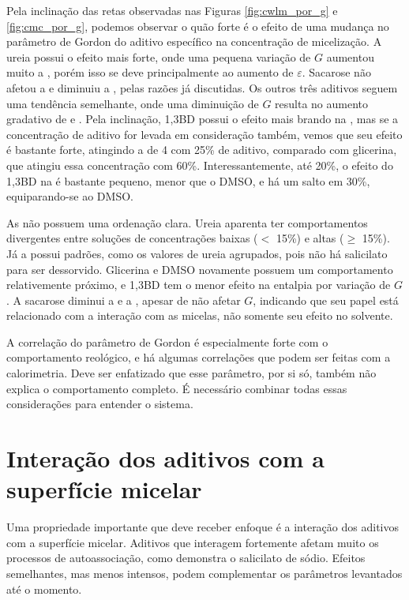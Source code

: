 		Pela inclinação das retas observadas nas Figuras \ref{fig:cwlm_por_g} e \ref{fig:cmc_por_g}, podemos observar o quão forte é o efeito de uma mudança no parâmetro de Gordon do aditivo específico na concentração de micelização. A ureia possui o efeito mais forte, onde uma pequena variação de \(G\) aumentou muito a \cmc, porém isso se deve principalmente ao aumento de \(\varepsilon\). Sacarose não afetou a \cwlm{} e diminuiu a \cmc, pelas razões já discutidas. Os outros três aditivos seguem uma tendência semelhante, onde uma diminuição de \(G\) resulta no aumento gradativo de \cwlm{} e \cmc. Pela inclinação, 1,3BD possui o efeito mais brando na \cwlm, mas se a concentração de aditivo for levada em consideração também, vemos que seu efeito é bastante forte, atingindo a \cwlm{} de 4 \mM{} com 25\% de aditivo, comparado com glicerina, que atingiu essa concentração com 60\%. Interessantemente, até 20\%, o efeito do 1,3BD na \cmc{} é bastante pequeno, menor que o DMSO, e há um salto em 30\%, equiparando-se ao DMSO.
				
		As \DHwlm{} não possuem uma ordenação clara. Ureia aparenta ter comportamentos divergentes entre soluções de concentrações baixas (\(<\) 15\%) e altas (\(\ge\) 15\%). Já a \DHmic{} possui padrões, como os valores de ureia agrupados, pois não há salicilato para ser dessorvido. Glicerina e DMSO novamente possuem um comportamento relativemente próximo, e 1,3BD tem o menor efeito na entalpia por variação de \(G\). A sacarose diminui a \DHmic{} e a \cmc{}, apesar de não afetar \(G\), indicando que seu papel está relacionado com a interação com as micelas, não somente seu efeito no solvente.
		
		A correlação do parâmetro de Gordon é especialmente forte com o comportamento reológico, e há algumas correlações que podem ser feitas com a calorimetria. Deve ser enfatizado que esse parâmetro, por si só, também não explica o comportamento completo. É necessário combinar todas essas considerações para entender o sistema.
		\FloatBarrier
		
		\section{Interação dos aditivos com a superfície micelar}
		
		Uma propriedade importante que deve receber enfoque é a interação dos aditivos com a superfície micelar. Aditivos que interagem fortemente afetam muito os processos de autoassociação, como demonstra o salicilato de sódio. Efeitos semelhantes, mas menos intensos, podem complementar os parâmetros levantados até o momento.
		
